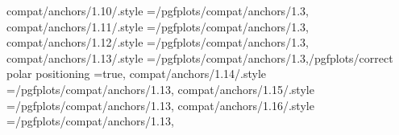 compat/anchors/1.10/.style                                         ={/pgfplots/compat/anchors/1.3},                                                                                                   
compat/anchors/1.11/.style                                         ={/pgfplots/compat/anchors/1.3},                                                                                                   
compat/anchors/1.12/.style                                         ={/pgfplots/compat/anchors/1.3},                                                                                                   
compat/anchors/1.13/.style                                         ={/pgfplots/compat/anchors/1.3,/pgfplots/correct polar positioning                                                                  =true},                                                   
compat/anchors/1.14/.style                                         ={/pgfplots/compat/anchors/1.13},                                                                                                  
compat/anchors/1.15/.style                                         ={/pgfplots/compat/anchors/1.13},                                                                                                  
compat/anchors/1.16/.style                                         ={/pgfplots/compat/anchors/1.13},                                                                                                  
